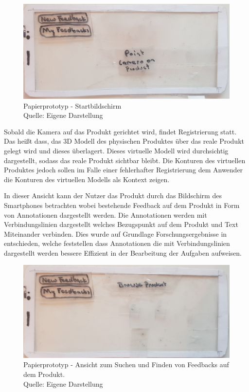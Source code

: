 \begin{figure}[H]
	\centering
	\includegraphics[width=.7\textwidth]{resources/conception/lowfi_startbildschirm.jpg}
	\caption{Papierprototyp - Startbildschirm  \\Quelle: Eigene Darstellung}
	\label{img:pp_start}
\end{figure}

Sobald die Kamera auf das Produkt gerichtet wird, findet Registrierung statt. Das heißt dass, das 3D Modell des physischen Produktes über das reale Produkt gelegt wird und dieses überlagert. 
Dieses virtuelle Modell wird durchsichtig dargestellt, sodass das reale Produkt sichtbar bleibt. Die Konturen des virtuellen Produktes jedoch sollen im Falle einer fehlerhafter Registrierung dem Anwender 
die Konturen des virtuellen Modells als Kontext zeigen.

In dieser Ansicht kann der Nutzer das Produkt durch das Bildschirm des Smartphones betrachten wobei bestehende Feedback auf dem Produkt in Form von Annotationen dargestellt werden. Die Annotationen werden mit Verbindungslinien dargestellt welches Bezugspunkt auf dem Produkt und Text Miteinander verbinden. Dies wurde auf Grundlage Forschungsergebnisse in \cite{Brandenburg2019} \cite{Polys2007} entschieden, welche feststellen dass Annotationen die mit Verbindungslinien dargestellt werden bessere Effizient in der Bearbeitung der Aufgaben aufweisen.

\begin{figure}[H]
	\centering
	\includegraphics[width=.7\textwidth]{resources/conception/lowfi_browseOnProduct.jpg}
	\caption{Papierprototyp - Ansicht zum Suchen und Finden von Feedbacks auf dem Produkt. \\Quelle: Eigene Darstellung}
	\label{img:lowfibowseonproduct}
\end{figure}

